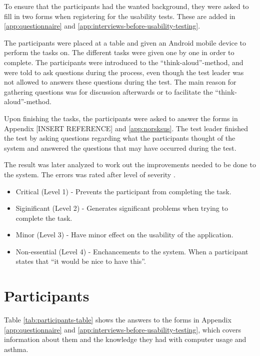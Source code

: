 To ensure that the participants had the wanted background, they were asked to fill in two forms when registering for the usability tests. These are added in \ref{app:questionnaire} and \ref{app:interviews-before-usability-testing}.



The participants were placed at a table and given an Android mobile device to perform the tasks on. The different tasks were given one by one in order to complete. The participants were introduced to the ``think-aloud''-method, and were told to ask questions during the process, even though the test leader was not allowed to answers these questions during the test. The main reason for gathering questions was for discussion afterwards or to facilitate the ``think-aloud''-method. 

Upon finishing the tasks, the participants were asked to answer the forms in Appendix [INSERT REFERENCE] and \ref{app:norsksus}. The test leader finished the test by asking questions regarding what the participants thought of the system and answered the questions that may have occurred during the test. 

The result was later analyzed to work out the improvements needed to be done to the system. The errors was rated after level of severity \cite{dumas1995practical}. 

\begin{itemize}
\item{Critical (Level 1) - Prevents the participant from completing the task.}
\item{Siginificant (Level 2) - Generates significant problems when trying to complete the task.}
\item{Minor (Level 3) - Have minor effect on the usability of the application.}
\item{Non-essential (Level 4) - Enchancements to the system. When a participant states that ``it would be nice to have this''.}
\end{itemize}


\section{Participants}
\label{sec:participants}
Table \ref{tab:participants-table} shows the answers to the forms in Appendix \ref{app:questionnaire} and \ref{app:interviews-before-usability-testing}, which covers information about them and the knowledge they had with computer usage and asthma.

